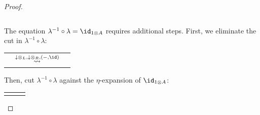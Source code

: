 \documentclass[DIN, pagenumber=false, fontsize=11pt, parskip=half, colorinlistoftodos, svgnames]{scrartcl}
\begin{document}
\begin{proof}
\begin{tabularx}{\textwidth}{c x c x}
		\end{tabularx}
		
		The equation $\lambda^{-1} \circ \lambda = \id_{1 \otimes A} $ requires additional steps. First, we eliminate the cut in $\lambda^{-1} \circ \lambda$:
		
		\begin{tabularx}{\textwidth}{x c x}
			&
			$\overset{\downarrow \otimes_L, \downarrow \otimes_R, (-, \id) }{\rightsquigarrow}$
			&
						
		\end{tabularx}
		
		Then, cut $\lambda^{-1} \circ \lambda$ against the $\eta$-expansion of $\id_{1 \otimes A}$:
		
		\begin{tabularx}{\textwidth}{x c x}
			
\end{tabularx}
\end{proof}
\end{document}
